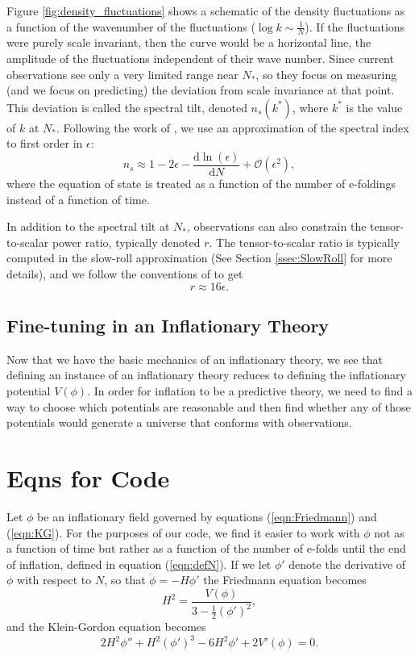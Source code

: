 \documentclass[onecolumn,apj]{emulateapj}
\def\d{\mathrm{d}}
\def\half{\tfrac{1}{2}}
\begin{document}
Figure \ref{fig:density_fluctuations} shows a schematic of the density fluctuations as a function of the wavenumber of the fluctuations ($\log k\sim\tfrac{1}{N}$). If the fluctuations were purely scale invariant, then the curve would be a horizontal line, the amplitude of the fluctuations independent of their wave number. Since current observations see only a very limited range near $N_*$, so they focus on measuring (and we focus on predicting) the deviation from scale invariance at that point. This deviation is called the spectral tilt, denoted $n_s(k^*)$, where $k^*$ is the value of $k$ at $N_*$. Following the work of \citet{Wang+1997}, we use an approximation of the spectral index to first order in $\epsilon$:
\begin{equation}
n_s \approx 1 - 2\epsilon - \frac{\d \ln(\epsilon)}{\d N} + \mathcal{O}(\epsilon^2),
\label{eqn:ns_def}
\end{equation}
where the equation of state is treated as a function of the number of e-foldings instead of a function of time. 

In addition to the spectral tilt at $N_*$, observations can also constrain the tensor-to-scalar power ratio, typically denoted $r$. The tensor-to-scalar ratio is typically computed in the slow-roll approximation (See Section \ref{ssec:SlowRoll} for more details), and we follow the conventions of \citet{Planck2013} to get 
\begin{equation}
r \approx 16 \epsilon.
\end{equation}


\subsection{Fine-tuning in an Inflationary Theory}
Now that we have the basic mechanics of an inflationary theory, we see that defining an instance of an inflationary theory reduces to defining the inflationary potential $V(\phi)$. In order for inflation to be a predictive theory, we need to find a way to choose which potentials are reasonable and then find whether any of those potentials would generate a universe that conforms with observations. 


\section{Eqns for Code}
Let $\phi$ be an inflationary field governed by equations (\ref{eqn:Friedmann}) and (\ref{eqn:KG}). For the purposes of our code, we find it easier to work with $\phi$ not as a function of time but rather as a function of the number of e-folds until the end of inflation, defined in equation (\ref{eqn:defN}). If we let $\phi'$ denote the derivative of $\phi$ with respect to $N$, so that $\dot \phi = -H \phi'$ the Friedmann equation becomes
\begin{equation}
H^2 = \frac{V(\phi)}{3 - \half(\phi')^2},
\end{equation}
and the Klein-Gordon equation becomes 
\begin{equation}
2H^2\phi'' + H^2(\phi')^3 - 6H^2\phi' + 2V'(\phi) = 0.
\label{eqn:KG_N}
\end{equation}
\end{document}
